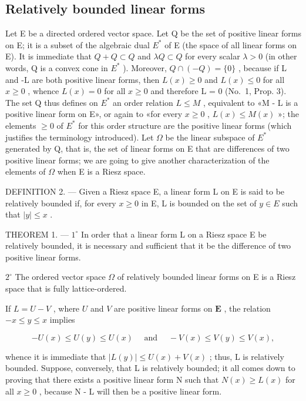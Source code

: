 \subsection{Relatively bounded linear forms}

Let E be a directed ordered vector space. Let Q be the set of positive linear forms on E; it is a subset of the algebraic dual \(E^{*}\) of E (the space of all linear forms on E). It is immediate that \(Q + Q \subset Q\) and \(\lambda Q \subset Q\) for every scalar \(\lambda > 0\) (in other words, Q is a convex cone in \(E^{*}\) ). Moreover, \(Q \cap (-Q) = \{0\}\) , because if L and -L are both positive linear forms, then \(L(x) \geqslant 0\) and \(L(x) \leqslant 0\) for all \(x \geqslant 0\) , whence \(L(x) = 0\) for all \(x \geqslant 0\) and therefore L = 0 (No.~1, Prop. 3). The set Q thus defines on \(E^{*}\) an order relation \(L \leqslant M\) , equivalent to «M - L is a positive linear form on E», or again to «for every \(x \geqslant 0\) , \(L(x) \leqslant M(x)\) »; the elements \(\geqslant 0\) of \(E^{*}\) for this order structure are the positive linear forms (which justifies the terminology introduced). Let \(\Omega\) be the linear subspace of \(E^{*}\) generated by Q, that is, the set of linear forms on E that are differences of two positive linear forms; we are going to give another characterization of the elements of \(\Omega\) when E is a Riesz space.

DEFINITION 2. --- Given a Riesz space E, a linear form L on E is said to be relatively bounded if, for every \(x \geqslant 0\) in E, L is bounded on the set of \(y \in E\) such that \(|y| \leqslant x\) .

THEOREM 1. --- \(1^{\circ}\) In order that a linear form L on a Riesz space E be relatively bounded, it is necessary and sufficient that it be the difference of two positive linear forms.

\(2^{\circ}\) The ordered vector space \(\Omega\) of relatively bounded linear forms on E is a Riesz space that is fully lattice-ordered.

If \(L = U - V\) , where \(U\) and \(V\) are positive linear forms on \(\mathbf{E}\) , the relation \(-x \leqslant y \leqslant x\) implies

\[
- U (x) \leqslant U (y) \leqslant U (x) \quad \text { and } \quad - V (x) \leqslant V (y) \leqslant V (x),
\]

whence it is immediate that \(|L(y)| \leqslant U(x) + V(x)\) ; thus, L is relatively bounded. Suppose, conversely, that L is relatively bounded; it all comes down to proving that there exists a positive linear form N such that \(N(x) \geqslant L(x)\) for all \(x \geqslant 0\) , because N - L will then be a positive linear form.

